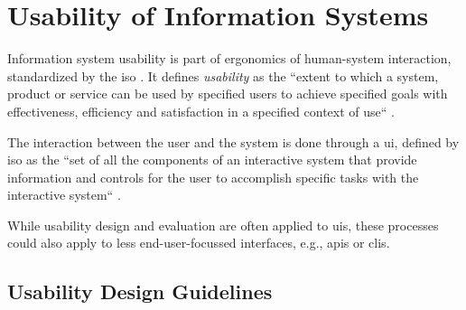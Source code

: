 


\section{Usability of Information Systems} \label{sec:foundations-usability}

Information system usability is part of ergonomics of human-system interaction, standardized by the \ac{iso} \cite{noauthor_ergonomics_2020}. It defines \textit{usability} as the ``extent to which a system, product or service can be used by specified users to achieve specified goals with effectiveness, efficiency and satisfaction in a specified context of use`` \cite{noauthor_ergonomics_2020}.

The interaction between the user and the system is done through a \acf{ui}, defined by \ac{iso} as the ``set of all the components of an interactive system that provide information and controls for the user to accomplish specific tasks with the interactive system`` \cite{noauthor_ergonomics_2020}.

While usability design and evaluation are often applied to \acp{ui}, these processes could also apply to less end-user-focussed interfaces, e.g., \acp{api} or \acp{cli}.

\subsection{Usability Design Guidelines} \label{subs:foundations-usability-design}

